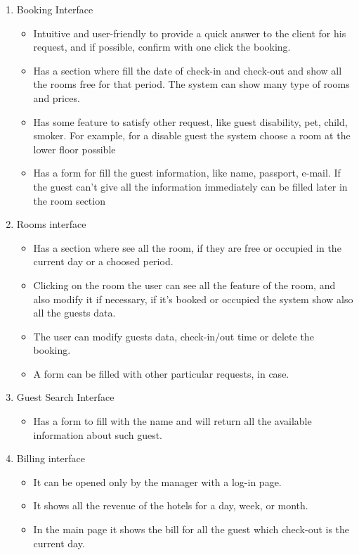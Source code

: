 \begin{enumerate}
	
\item Booking Interface
    \begin{itemize}
		\item Intuitive and user-friendly to provide a quick answer to the client for his request, and if possible, confirm with one click the booking.
		\item Has a section where fill the date of check-in and check-out and show all the rooms free for that period. The system can show many type of rooms and prices.
		\item Has some feature to satisfy other request, like guest disability, pet, child, smoker. For example, for a disable guest the system choose a room at the lower floor possible
		\item Has a form for fill the guest information, like name, passport, e-mail. If the guest can't give all the information immediately can be filled later in the room section
    \end{itemize}
	
\item Rooms interface
    \begin{itemize}
		\item Has a section where see all the room, if they are free or occupied in the current day or a choosed period.
		\item Clicking on the room the user can see all the feature of the room, and also modify it if necessary, if it's booked or occupied the system show also all the guests data.
		\item The user can modify guests data, check-in/out time or delete the booking. 
		\item A form can be filled with other particular requests, in case.
    \end{itemize}
    
\item Guest Search Interface
	\begin{itemize}
		\item Has a form to fill with the name and will return all the available information about such guest. 
	\end{itemize}

\item Billing interface
    \begin{itemize}
		\item It can be opened only by the manager with a log-in page.
		\item It shows all the revenue of the hotels for a day, week, or month.
		\item In the main page it shows the bill for all the guest which check-out is the current day.
    \end{itemize}

\end{enumerate}

